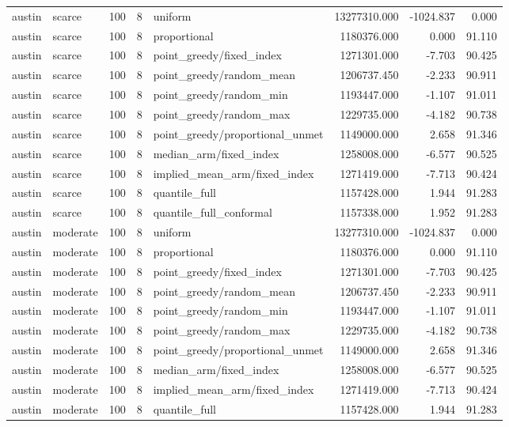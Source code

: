 \begin{tabular}{llrrlrrr}
austin & scarce & 100 & 8 & uniform & 13277310.000 & -1024.837 & 0.000 \\
austin & scarce & 100 & 8 & proportional & 1180376.000 & 0.000 & 91.110 \\
austin & scarce & 100 & 8 & point\_greedy/fixed\_index & 1271301.000 & -7.703 & 90.425 \\
austin & scarce & 100 & 8 & point\_greedy/random\_mean & 1206737.450 & -2.233 & 90.911 \\
austin & scarce & 100 & 8 & point\_greedy/random\_min & 1193447.000 & -1.107 & 91.011 \\
austin & scarce & 100 & 8 & point\_greedy/random\_max & 1229735.000 & -4.182 & 90.738 \\
austin & scarce & 100 & 8 & point\_greedy/proportional\_unmet & 1149000.000 & 2.658 & 91.346 \\
austin & scarce & 100 & 8 & median\_arm/fixed\_index & 1258008.000 & -6.577 & 90.525 \\
austin & scarce & 100 & 8 & implied\_mean\_arm/fixed\_index & 1271419.000 & -7.713 & 90.424 \\
austin & scarce & 100 & 8 & quantile\_full & 1157428.000 & 1.944 & 91.283 \\
austin & scarce & 100 & 8 & quantile\_full\_conformal & 1157338.000 & 1.952 & 91.283 \\
austin & moderate & 100 & 8 & uniform & 13277310.000 & -1024.837 & 0.000 \\
austin & moderate & 100 & 8 & proportional & 1180376.000 & 0.000 & 91.110 \\
austin & moderate & 100 & 8 & point\_greedy/fixed\_index & 1271301.000 & -7.703 & 90.425 \\
austin & moderate & 100 & 8 & point\_greedy/random\_mean & 1206737.450 & -2.233 & 90.911 \\
austin & moderate & 100 & 8 & point\_greedy/random\_min & 1193447.000 & -1.107 & 91.011 \\
austin & moderate & 100 & 8 & point\_greedy/random\_max & 1229735.000 & -4.182 & 90.738 \\
austin & moderate & 100 & 8 & point\_greedy/proportional\_unmet & 1149000.000 & 2.658 & 91.346 \\
austin & moderate & 100 & 8 & median\_arm/fixed\_index & 1258008.000 & -6.577 & 90.525 \\
austin & moderate & 100 & 8 & implied\_mean\_arm/fixed\_index & 1271419.000 & -7.713 & 90.424 \\
austin & moderate & 100 & 8 & quantile\_full & 1157428.000 & 1.944 & 91.283 \\

\end{tabular}
